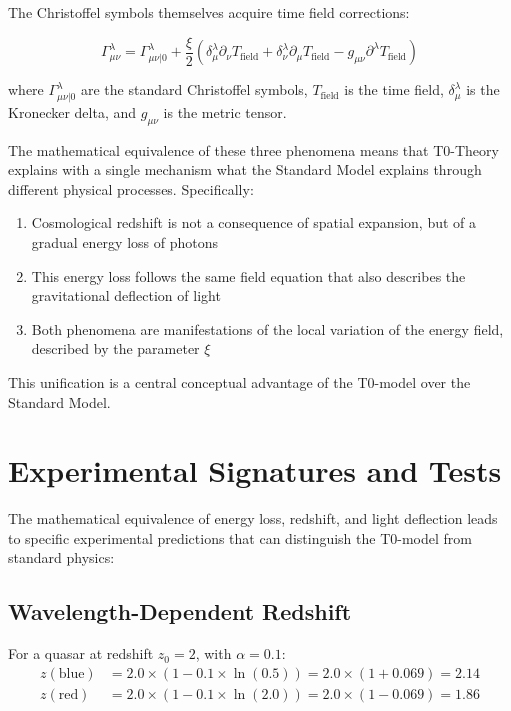 \documentclass[12pt,a4paper]{article}
\newcommand{\tfield}{T_{\text{field}}}
\theoremstyle{definition}
\begin{document}
	The Christoffel symbols themselves acquire time field corrections:
	
	\begin{equation}
		\Gamma^\lambda_{\mu\nu} = \Gamma^\lambda_{\mu\nu|0} + \frac{\xi}{2} \left(\delta^\lambda_\mu \partial_\nu \tfield + \delta^\lambda_\nu \partial_\mu \tfield - g_{\mu\nu} \partial^\lambda \tfield\right)
	\end{equation}
	
	where $\Gamma^\lambda_{\mu\nu|0}$ are the standard Christoffel symbols, $\tfield$ is the time field, $\delta^\lambda_\mu$ is the Kronecker delta, and $g_{\mu\nu}$ is the metric tensor.
	
	\begin{important}
		The mathematical equivalence of these three phenomena means that T0-Theory explains with a single mechanism what the Standard Model explains through different physical processes. Specifically:
		
		\begin{enumerate}
			\item Cosmological redshift is not a consequence of spatial expansion, but of a gradual energy loss of photons
			\item This energy loss follows the same field equation that also describes the gravitational deflection of light
			\item Both phenomena are manifestations of the local variation of the energy field, described by the parameter $\xi$
		\end{enumerate}
		
		This unification is a central conceptual advantage of the T0-model over the Standard Model.
	\end{important}
	
	\section{Experimental Signatures and Tests}
	
	The mathematical equivalence of energy loss, redshift, and light deflection leads to specific experimental predictions that can distinguish the T0-model from standard physics:
	
	\subsection{Wavelength-Dependent Redshift}
	
	For a quasar at redshift $z_0 = 2$, with $\alpha = 0.1$:
	\begin{align}
		z(\text{blue}) &= 2.0 \times (1 - 0.1 \times \ln(0.5)) = 2.0 \times (1 + 0.069) = 2.14 \\
		z(\text{red}) &= 2.0 \times (1 - 0.1 \times \ln(2.0)) = 2.0 \times (1 - 0.069) = 1.86
	\end{align}
	
\end{document}
